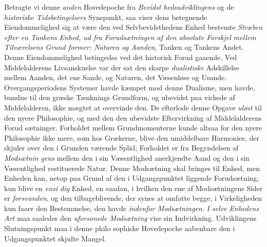 Betragte vi denne \emph{anden} Hovedepoche fra \emph{Bevidst\-%
hedsudviklingens} og de \emph{historiske Tidsbetingelsers}
Synspunkt, saa viser dens betegnende Eiendommelighed sig
at være den ved Selvbevidsthedens Enhed bestemte \emph{Stræben
efter en Tankens Enhed, ud fra Forudsætningen af
den absolute Forskjel mellem Tilværelsens Grund\-%
former: Naturen og Aanden}, Tanken og Tankens Andet.
Denne Eiendommelighed betingedes ved det historisk Forud\-%
gaaende. Ved Middelalderens Livsanskuelse var der sat den
skarpe \emph{dualistiske} Adskillelse mellem Aanden, det ene Sande,
og Naturen, det Væsenløse og Usande. Overgangsperiodens
Systemer havde kæmpet mod denne Dualisme, men havde,
bundne til den græske Tænknings Grundform, og ubevidst paa\-%
virkede af Middelalderen, ikke mægtet at overvinde den. De
efterlode denne Opgave \emph{uløst} til den nyere Philosophie, og
med den den ubevidste Eftervirkning af Middelalderens Forud\-%
sætninger. Forholdet mellem Grundmomenterne kunde altsaa
for den nyere Philosophie ikke mere, som hos Grækerne, blive
den umiddelbare Harmonies, der skjuler over den i Grunden
værende Splid; Forholdet er fra Begyndelsen af \emph{Modsætnin\-%
gens} mellem den i sin Væsentlighed anerkjendte Aand og den
i sin Væsentlighed restituerede Natur. Denne Modsætning skal
bringes til Enhed, men Enheden kan, netop paa Grund af den
i Udgangspunktet liggende Forudsætning, kun blive en \emph{ensi\-%
dig} Enhed, en saadan, i hvilken den ene af Modsætningens
Sider er \emph{forsvunden}, og den tilbageblivende, der synes at
omfatte begge, i Virkeligheden kun faaer den Bestemmelse,
den havde \emph{indenfor Modsætningen}. \emph{I selve Enhedens
Art} maa saaledes den \emph{uforsonede Modsætning} vise sin
Indvirkning. Udviklingens Slutningspunkt maa i denne philo\-%
sophiske Hovedepoche aabenbare den i Udgangspunktet skjulte
Mangel.

